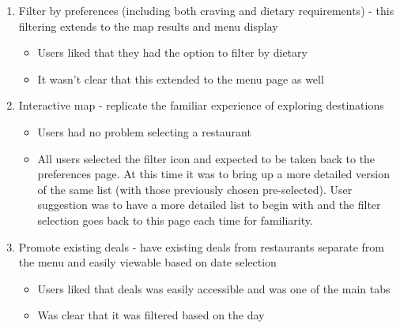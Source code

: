 \documentclass[a4 paper, 12pt]{article}
\begin{document}
\begin{enumerate}
    \item Filter by preferences (including both craving and dietary requirements) - this filtering extends to the map results and menu display
        \begin{itemize}
            \item Users liked that they had the option to filter by dietary
            \item It wasn't clear that this extended to the menu page as well
        \end{itemize}

    \item Interactive map - replicate the familiar experience of exploring destinations
        \begin{itemize}
            \item Users had no problem selecting a restaurant
            \item All users selected the filter icon and expected to be taken back to the preferences page. At this time it was to bring up a more detailed version of the same list (with those previously chosen pre-selected). User suggestion was to have a more detailed list to begin with and the filter selection goes back to this page each time for familiarity.
        \end{itemize}

    \item Promote existing deals - have existing deals from restaurants separate from the menu and easily viewable based on date selection
        \begin{itemize}
            \item Users liked that deals was easily accessible and was one of the main tabs
            \item Was clear that it was filtered based on the day
        \end{itemize}


\end{enumerate}
\end{document}
